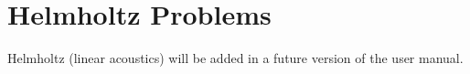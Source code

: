 %
%


\section{Helmholtz Problems}
\label{sec:helmholtz}


Helmholtz (linear acoustics) will be added in a future version of the user manual.


